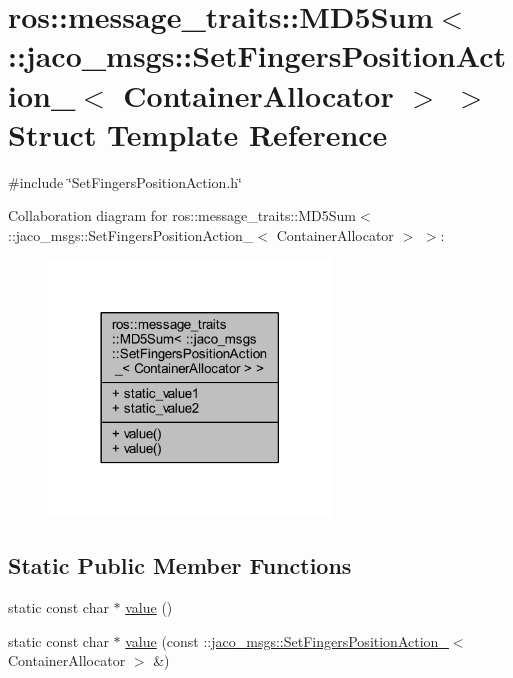 \hypertarget{structros_1_1message__traits_1_1MD5Sum_3_01_1_1jaco__msgs_1_1SetFingersPositionAction___3_01ContainerAllocator_01_4_01_4}{}\section{ros\+:\+:message\+\_\+traits\+:\+:M\+D5\+Sum$<$ \+:\+:jaco\+\_\+msgs\+:\+:Set\+Fingers\+Position\+Action\+\_\+$<$ Container\+Allocator $>$ $>$ Struct Template Reference}
\label{structros_1_1message__traits_1_1MD5Sum_3_01_1_1jaco__msgs_1_1SetFingersPositionAction___3_01ContainerAllocator_01_4_01_4}


{\ttfamily \#include \char`\"{}Set\+Fingers\+Position\+Action.\+h\char`\"{}}



Collaboration diagram for ros\+:\+:message\+\_\+traits\+:\+:M\+D5\+Sum$<$ \+:\+:jaco\+\_\+msgs\+:\+:Set\+Fingers\+Position\+Action\+\_\+$<$ Container\+Allocator $>$ $>$\+:
\nopagebreak
\begin{figure}[H]
\begin{center}
\leavevmode
\includegraphics[width=213pt]{de/db4/structros_1_1message__traits_1_1MD5Sum_3_01_1_1jaco__msgs_1_1SetFingersPositionAction___3_01Cont8fa5b7bdb012e998a46160ae684c4aed}
\end{center}
\end{figure}
\subsection*{Static Public Member Functions}
\begin{DoxyCompactItemize}
\item 
static const char $\ast$ \hyperlink{structros_1_1message__traits_1_1MD5Sum_3_01_1_1jaco__msgs_1_1SetFingersPositionAction___3_01ContainerAllocator_01_4_01_4_adf2eb9b97ac563b6afdb3f41bab6f03e}{value} ()
\item 
static const char $\ast$ \hyperlink{structros_1_1message__traits_1_1MD5Sum_3_01_1_1jaco__msgs_1_1SetFingersPositionAction___3_01ContainerAllocator_01_4_01_4_a24c403eac9f2c13c1e5229193a2ee80a}{value} (const \+::\hyperlink{structjaco__msgs_1_1SetFingersPositionAction__}{jaco\+\_\+msgs\+::\+Set\+Fingers\+Position\+Action\+\_\+}$<$ Container\+Allocator $>$ \&)
\end{DoxyCompactItemize}
